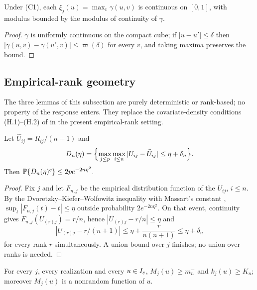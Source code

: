 \begin{lemma}\label{lem:app-envelope-cont}
Under (C1), each $\xi_j(u)=\max_v\gamma(u,v)$ is continuous on $[0,1]$,
with modulus bounded by the modulus of continuity of $\gamma$.
\end{lemma}

\begin{proof}
$\gamma$ is uniformly continuous on the compact cube; if
$|u-u'|\le\delta$ then $|\gamma(u,v)-\gamma(u',v)|\le\varpi(\delta)$ for
every $v$, and taking maxima preserves the bound.
\end{proof}

\subsection{Empirical-rank geometry}\label{app:rankgeom}

The three lemmas of this subsection are purely deterministic or
rank-based; no property of the response enters.  They replace the
covariate-density conditions (H.1)--(H.2) of
\citet{gardesPodgorny2025} in the present empirical-rank setting.

\begin{lemma}\label{lem:app-dkw}
Let $\widehat U_{ij}=R_{ij}/(n+1)$ and
\[
 D_n(\eta)=\Bigl\{\max_{j\le p}\max_{i\le n}
 |U_{ij}-\widehat U_{ij}|\le\eta+\delta_n\Bigr\}.
\]
Then $\mathbb P\{D_n(\eta)^c\}\le2pe^{-2n\eta^2}$.
\end{lemma}

\begin{proof}
Fix $j$ and let $F_{n,j}$ be the empirical distribution function of the
$U_{ij}$, $i\le n$.  By the Dvoretzky--Kiefer--Wolfowitz inequality with
Massart's constant \citep{massart1990},
$\sup_t|F_{n,j}(t)-t|\le\eta$ outside probability
$2e^{-2n\eta^2}$.  On that event, continuity gives
$F_{n,j}(U_{(r)j})=r/n$, hence $|U_{(r)j}-r/n|\le\eta$ and
\[
 |U_{(r)j}-r/(n+1)|\le\eta+\frac{r}{n(n+1)}\le\eta+\delta_n
\]
for every rank $r$ simultaneously.  A union bound over $j$ finishes; no
union over ranks is needed.
\end{proof}

\begin{lemma}\label{lem:app-counts}
For every $j$, every realization and every $u\in I_\varepsilon$,
$M_j(u)\ge m_n^-$ and $k_j(u)\ge K_n$; moreover $M_j(u)$ is a nonrandom
function of $u$.
\end{lemma}

